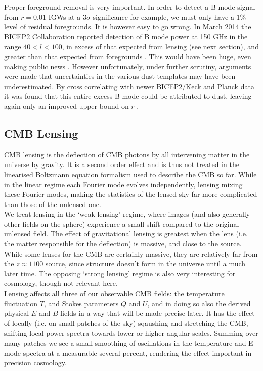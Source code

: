 \documentclass[a4paper,10pt]{article}
\begin{document}
Proper foreground removal is very important. In order to detect a B mode signal from $r=0.01$ IGWs at a $3\sigma$ significance for example, we must only have a $1\%$ level of residual foregrounds. It is however easy to go wrong. In March 2014 the BICEP2 Collaboration reported detection of B mode power at 150 GHz in the range $40<l<100$, in excess of that expected from lensing (see next section), and greater than that expected from foregrounds \cite{bicep2cockup}. This would have been huge, even making public news \cite{smokinggun}. However unfortunately, under further scrutiny, arguments were made that uncertainties in the various dust templates may have been underestimated. By cross correlating with newer BICEP2/Keck and Planck data it was found that this entire excess B mode could be attributed to dust, leaving again only an improved upper bound on $r$ \cite{bicep2cockup2}.


\subsection{CMB Lensing}
\label{lensing}
CMB lensing is the deflection of CMB photons by all intervening matter in the universe by gravity. It is a second order effect and is thus not treated in the linearised Boltzmann equation formalism used to describe the CMB so far. While in the linear regime each Fourier mode evolves independently, lensing mixing these Fourier modes, making the statistics of the lensed sky far more complicated than those of the unlensed one. \\

We treat lensing in the `weak lensing' regime, where images (and also generally other fields on the sphere) experience a small shift compared to the original unlensed field. The effect of gravitational lensing is greatest when the lens (i.e. the matter responsible for the deflection) is massive, and close to the source. While some lenses for the CMB are certainly massive, they are relatively far from the $z\approx1100$ source, since structure doesn't form in the universe until a much later time. The opposing `strong lensing' regime is also very interesting for cosmology, though not relevant here.\\

Lensing affects all three of our observable CMB fields: the temperature fluctuation $T$, and Stokes parameters $Q$ and $U$, and in doing so also the derived physical $E$ and $B$ fields in a way that will be made precise later. It has the effect of locally (i.e. on small patches of the sky) sqaushing and stretching the CMB, shifting local power spectra towards lower or higher angular scales. Summing over many patches we see a small smoothing of oscillations in the temperature and E mode spectra at a measurable several percent, rendering the effect important in precision cosmology. \\
\end{document}
